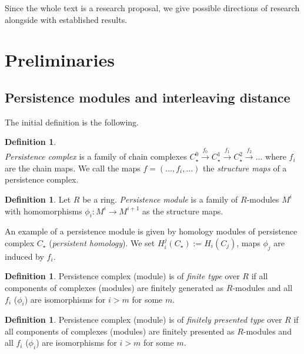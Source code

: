 \documentclass[a4paper, 12pt]{article}
\newcounter{stmcounter}[section]
\numberwithin{equation}{section}
\theoremstyle{definition}
\newtheorem{definition}[stmcounter]{Definition}
\theoremstyle{remark}
\newcommand{\define}[1]{{\textit{#1}}}
\begin{document}
Since the whole text is a research proposal, we give possible directions of research alongside with established results.

\section{Preliminaries}

\subsection{Persistence modules and interleaving distance}

The initial definition is the following.

\begin{definition} {\cite[Definition 3.1]{Zomorodian05}}\\
  \define{Persistence complex} is a family of chain complexes $C_{\star}^{0} \xrightarrow{f_0} C_{\star}^{1} \xrightarrow{f_1} C_{\star}^{2} \xrightarrow{f_2} \ldots$ where $f_i$ are the chain maps. We call the maps $f=(\ldots,f_i,\ldots)$ the \define{structure maps} of a persistence complex.
\end{definition}

\begin{definition}
  Let $R$ be a ring. \define{Persistence module} is a family of $R$-modules $M^i$ with homomorphisms $\phi_i : M^i \to M^{i+1}$ as the structure maps.
\end{definition}

An example of a persistence module is given by homology modules of persistence complex $C_{\star}$ (\define{persistent homology}). We set $H_i^j(C_{\star}) := H_i(C_{j})$, maps $\phi_j$ are induced by $f_i$.\\

\begin{definition}
  Persistence complex (module) is of \define{finite type} over $R$ if all components of complexes (modules) are finitely generated as $R$-modules and all $f_i$ ($\phi_i$) are isomorphisms for $i > m$ for some $m$.
\end{definition}

\begin{definition}
  Persistence complex (module) is of \define{finitely presented type} over $R$ if all components of complexes (modules) are finitely presented as $R$-modules and all $f_i$ ($\phi_i$) are isomorphisms for $i > m$ for some $m$.
\end{definition}
\end{document}

